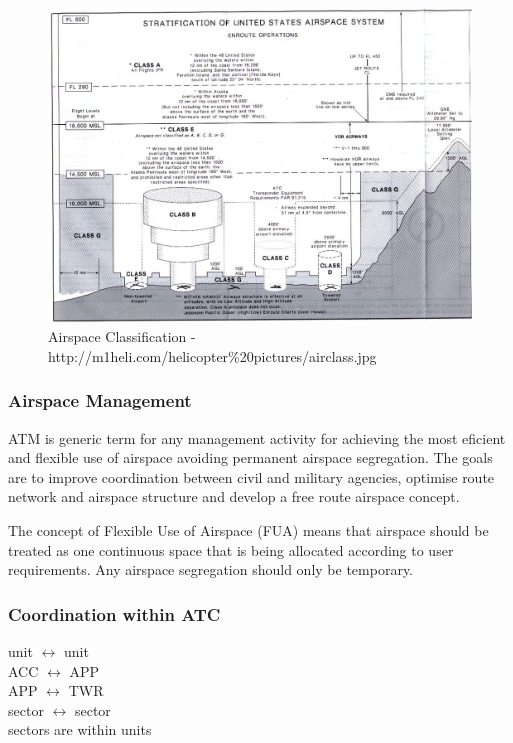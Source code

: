 \begin{figure}[h]
    \centering
    \includegraphics[width=\textwidth]{figures/classes2.jpg}
    \caption{Airspace Classification - http://m1heli.com/helicopter\%20pictures/airclass.jpg}
    \label{fig:classes2}
\end{figure}


\subsubsection{Airspace Management}
ATM is generic term for any management activity for achieving the most eficient and flexible use of airspace avoiding permanent airspace segregation. %
The goals are to improve coordination between civil and military agencies, optimise route network and airspace structure and develop a free route airspace concept.

The concept of Flexible Use of Airspace (FUA) means that airspace should be treated as one continuous space that is being allocated according to user requirements. Any airspace segregation should only be temporary.

\subsubsection{Coordination within ATC}
unit $\leftrightarrow$ unit \\
ACC $\leftrightarrow$ APP \\
APP $\leftrightarrow$ TWR \\
sector $\leftrightarrow$ sector \\
sectors are within units

